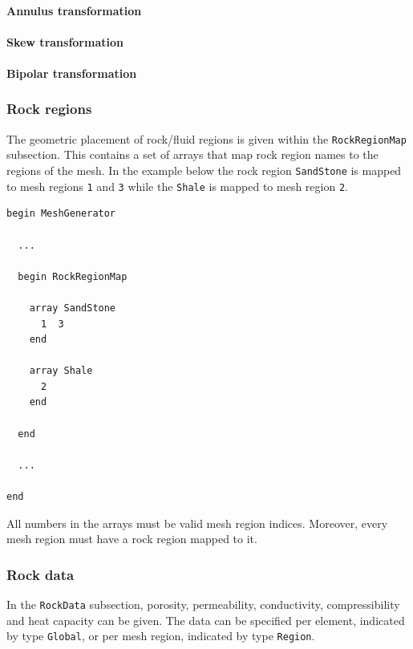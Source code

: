 \paragraph{Annulus transformation}


\paragraph{Skew transformation}


\paragraph{Bipolar transformation}




\label{sec:struct-rockregions}


\subsubsection{Rock regions}
\label{sec:rock-regions}

The geometric placement of rock/fluid regions is given within the
\texttt{RockRegionMap} subsection. This contains a set of arrays that
map rock region names to the regions of the mesh. In the example below
the rock region \texttt{SandStone} is mapped to mesh regions
\texttt{1} and \texttt{3} while the \texttt{Shale} is mapped to mesh
region \texttt{2}. 

\begin{verbatim}
begin MeshGenerator

  ... 

  begin RockRegionMap

    array SandStone
      1  3
    end

    array Shale
      2
    end

  end

  ... 

end
\end{verbatim}
%
All numbers in the arrays must be valid mesh region indices. Moreover,
every mesh region must have a rock region mapped to it. 

\subsubsection{Rock data}
\label{sec:struct-rockdata}

In the \texttt{RockData} subsection, porosity, permeability,
conductivity, compressibility and heat capacity can be given. The data
can be specified per element, indicated by type \texttt{Global}, or
per mesh region, indicated by type \texttt{Region}. 

